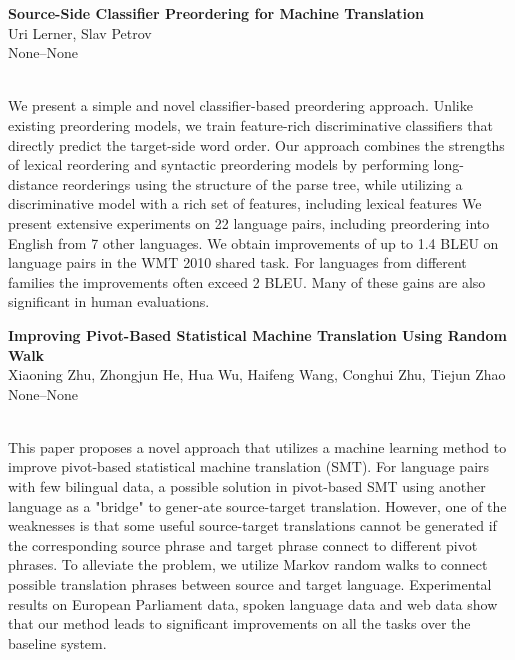\documentclass[twoside,makeidx]{book}
\begin{document}
\par\vspace{2em}\noindent%
\begin{minipage}{\linewidth}%
\begin{center}
\textbf{\normalsize Source-Side Classifier Preordering for Machine Translation}\\
\normalsize  Uri Lerner,  Slav Petrov\\
{\small None--None}\\
\end{center}
\end{minipage}\\[0.5em]
\nopagebreak%
\noindent%
{\small We present a simple and novel classifier-based preordering approach. Unlike existing preordering models, we train feature-rich discriminative classifiers that directly predict the target-side word order.  Our approach combines the strengths of lexical reordering and syntactic preordering models by performing long-distance reorderings using the structure of the parse tree, while utilizing a discriminative model with a rich set of features, including lexical features  We present extensive experiments on 22 language pairs, including preordering into English from 7 other languages. We obtain improvements of up to 1.4 BLEU on language pairs in the WMT 2010 shared task.                                      For languages from different families the improvements often exceed 2 BLEU. Many of these gains are also significant in human evaluations.}
\par\vspace{2em}\noindent%
\begin{minipage}{\linewidth}%
\begin{center}
\textbf{\normalsize Improving Pivot-Based Statistical Machine Translation Using Random Walk}\\
\normalsize  Xiaoning Zhu,  Zhongjun He,  Hua Wu,  Haifeng Wang,  Conghui Zhu,  Tiejun Zhao\\
{\small None--None}\\
\end{center}
\end{minipage}\\[0.5em]
\nopagebreak%
\noindent%
{\small This paper proposes a novel approach that utilizes a machine learning method to improve pivot-based statistical machine translation (SMT). For language pairs with few bilingual data, a possible solution in pivot-based SMT using another language as a "bridge" to gener-ate source-target translation. However, one of the weaknesses is that some useful source-target translations cannot be generated if the corresponding source phrase and target phrase connect to different pivot phrases. To alleviate the problem, we utilize Markov random walks to connect possible translation phrases between source and target language. Experimental results on European Parliament data, spoken language data and web data show that our method leads to significant improvements on all the tasks over the baseline system.}
\end{document}
